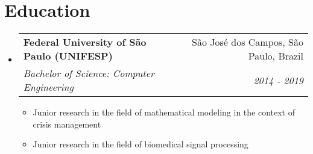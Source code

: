 \documentclass[letterpaper,10pt]{article}
\makeatletter
\newcommand{\resumeItem}[1]{
  \item\footnotesize{
    {#1 \vspace{-2pt}}
  }
}
\newcommand{\resumeSubheading}[4]{
  \vspace{6pt}\item
    \begin{tabular*}{0.97\textwidth}[t]{l@{\extracolsep{\fill}}r}
      \textbf{\small#1} & \small#2 \\
      \textit{\small#3} & \textit{\small #4} \\
    \end{tabular*}\vspace{-7pt}
}
\newcommand{\resumeSubHeadingListStart}{\begin{itemize}[leftmargin=0.15in, label={}]}
\newcommand{\resumeSubHeadingListEnd}{\end{itemize}}
\newcommand{\resumeItemListStart}{\begin{itemize}}
\newcommand{\resumeItemListEnd}{\end{itemize}\vspace{-5pt}}
\makeatother
\begin{document}
\section{Education}
  \resumeSubHeadingListStart
    \resumeSubheading
      {Federal University of São Paulo (UNIFESP)}{São José dos Campos, São Paulo, Brazil}
      {Bachelor of Science: Computer Engineering}{2014 - 2019}
      \resumeItemListStart
        \resumeItem{Junior research in the field of mathematical modeling in the context of crisis management}
        \resumeItem{Junior research in the field of biomedical signal processing}
      \resumeItemListEnd
  \resumeSubHeadingListEnd

\end{document}
